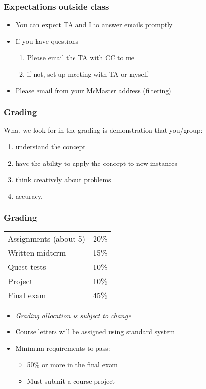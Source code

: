 \begin{frame}\frametitle{Expectations outside class}
	\begin{itemize}
		\item	You can expect TA and I to answer emails promptly
		\item	If you have questions
			\begin{enumerate}
				\item	Please email the TA with CC to me \hfill {\tiny{\color{myOrange}{$\longleftarrow$ hopefully this solves your problem}}}
				\item	if not, set up meeting with TA or myself
			\end{enumerate}
		\item	Please email from your McMaster address (filtering)
	\end{itemize}
\end{frame}

\begin{frame}\frametitle{Grading}
	What we look for in the grading is demonstration that you/group:
	\begin{enumerate}
		\item	understand the concept
		\item	have the ability to apply the concept to new instances
		\item	think creatively about problems
		\item	accuracy.
	\end{enumerate}
\end{frame}

\begin{frame}\frametitle{Grading}
	\begin{tabular}{ll}\\
		Assignments (about 5)       	& 20\% \\
	    Written midterm        			& 15\% \\
	    Quest tests						& 10\% \\
	    Project      					& 10\% \\
	    Final exam 						& 45\% \\
	\end{tabular}
	
	\vspace{12pt}
	\vspace{12pt}
	
	\begin{itemize}
		\item	\emph{Grading allocation is subject to change}
		\item	Course letters will be assigned using standard system
		\item	Minimum requirements to pass:
		\begin{itemize}
			\item	50\% or more in the final exam
			\item	Must submit a course project
		\end{itemize}
	\end{itemize}
\end{frame}


